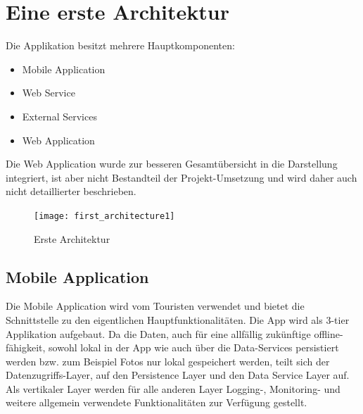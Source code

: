 \documentclass[a4paper,10pt,xetex]{article}
\begin{document}
\section{Eine erste Architektur}\label{eine-erste-architektur}
Die Applikation besitzt mehrere Hauptkomponenten:
\begin{itemize}
  \item Mobile Application
  \item Web Service
  \item External Services
  \item Web Application
\end{itemize}
Die Web Application wurde zur besseren Gesamtübersicht in die Darstellung integriert, ist aber nicht Bestandteil der Projekt-Umsetzung und wird daher auch nicht detaillierter beschrieben.

\begin{figure}
\centering
\texttt{[image: first\_architecture1]}
\caption{Erste Architektur}
\end{figure}


\subsection{Mobile Application}\label{mobile-application}
Die Mobile Application wird vom Touristen
verwendet und bietet die Schnittstelle zu den eigentlichen
Hauptfunktionalitäten. Die App wird als 3-tier Applikation aufgebaut. Da
die Daten, auch für eine allfällig zukünftige offline-fähigkeit, sowohl
lokal in der App wie auch über die Data-Services persistiert werden bzw.
zum Beispiel Fotos nur lokal gespeichert werden, teilt sich der
Datenzugriffs-Layer, auf den Persistence Layer und den Data Service
Layer auf. Als vertikaler Layer werden für alle anderen Layer Logging-,
Monitoring- und weitere allgemein verwendete Funktionalitäten zur
Verfügung gestellt.
\end{document}
